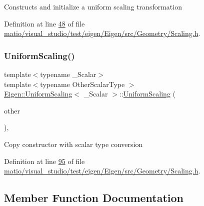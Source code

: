 Constructs and initialize a uniform scaling transformation 

Definition at line \hyperlink{matio_2visual__studio_2test_2eigen_2_eigen_2src_2_geometry_2_scaling_8h_source_l00048}{48} of file \hyperlink{matio_2visual__studio_2test_2eigen_2_eigen_2src_2_geometry_2_scaling_8h_source}{matio/visual\+\_\+studio/test/eigen/\+Eigen/src/\+Geometry/\+Scaling.\+h}.

\mbox{\label{class_eigen_1_1_uniform_scaling_a898cc0c97625ce671d7ea951f6eb2fc4}} 
\subsubsection{\texorpdfstring{Uniform\+Scaling()}{UniformScaling()}\hspace{0.1cm}{\footnotesize\ttfamily [6/6]}}
{\footnotesize\ttfamily template$<$typename \+\_\+\+Scalar$>$ \\
template$<$typename Other\+Scalar\+Type $>$ \\
\hyperlink{class_eigen_1_1_uniform_scaling}{Eigen\+::\+Uniform\+Scaling}$<$ \+\_\+\+Scalar $>$\+::\hyperlink{class_eigen_1_1_uniform_scaling}{Uniform\+Scaling} (\begin{DoxyParamCaption}\item[{const \hyperlink{class_eigen_1_1_uniform_scaling}{Uniform\+Scaling}$<$ Other\+Scalar\+Type $>$ \&}]{other }\end{DoxyParamCaption})\hspace{0.3cm}{\ttfamily [inline]}, {\ttfamily [explicit]}}

Copy constructor with scalar type conversion 

Definition at line \hyperlink{matio_2visual__studio_2test_2eigen_2_eigen_2src_2_geometry_2_scaling_8h_source_l00095}{95} of file \hyperlink{matio_2visual__studio_2test_2eigen_2_eigen_2src_2_geometry_2_scaling_8h_source}{matio/visual\+\_\+studio/test/eigen/\+Eigen/src/\+Geometry/\+Scaling.\+h}.



\subsection{Member Function Documentation}
\mbox{\label{class_eigen_1_1_uniform_scaling_af93a9ee1d6efc102b65a197f3ea3d4cd}} 
